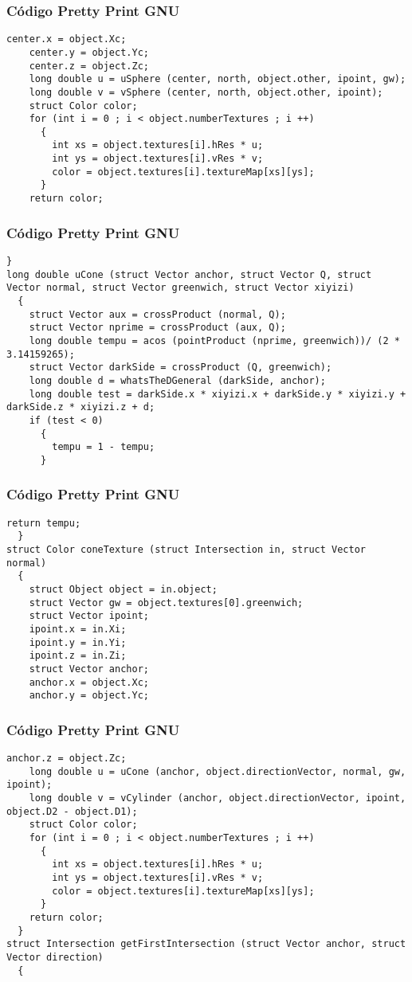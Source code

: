 \documentclass{beamer}
\begin{document}
\begin{frame}[fragile]
\frametitle{C\'odigo Pretty Print GNU}
\begin{lstlisting}[style=CStyle]
    center.x = object.Xc;
    center.y = object.Yc;
    center.z = object.Zc;
    long double u = uSphere (center, north, object.other, ipoint, gw);
    long double v = vSphere (center, north, object.other, ipoint);
    struct Color color;
    for (int i = 0 ; i < object.numberTextures ; i ++)
      {
        int xs = object.textures[i].hRes * u;
        int ys = object.textures[i].vRes * v;
        color = object.textures[i].textureMap[xs][ys];
      }
    return color;
\end{lstlisting}
\end{frame}
\begin{frame}[fragile]
\frametitle{C\'odigo Pretty Print GNU}
\begin{lstlisting}[style=CStyle]
  }
long double uCone (struct Vector anchor, struct Vector Q, struct Vector normal, struct Vector greenwich, struct Vector xiyizi)
  {
    struct Vector aux = crossProduct (normal, Q);
    struct Vector nprime = crossProduct (aux, Q);
    long double tempu = acos (pointProduct (nprime, greenwich))/ (2 * 3.14159265);
    struct Vector darkSide = crossProduct (Q, greenwich);
    long double d = whatsTheDGeneral (darkSide, anchor);
    long double test = darkSide.x * xiyizi.x + darkSide.y * xiyizi.y + darkSide.z * xiyizi.z + d;
    if (test < 0)
      {
        tempu = 1 - tempu;
      }
\end{lstlisting}
\end{frame}
\begin{frame}[fragile]
\frametitle{C\'odigo Pretty Print GNU}
\begin{lstlisting}[style=CStyle]
    return tempu;
  }
struct Color coneTexture (struct Intersection in, struct Vector normal)
  {
    struct Object object = in.object;
    struct Vector gw = object.textures[0].greenwich;
    struct Vector ipoint;
    ipoint.x = in.Xi;
    ipoint.y = in.Yi;
    ipoint.z = in.Zi;
    struct Vector anchor;
    anchor.x = object.Xc;
    anchor.y = object.Yc;
\end{lstlisting}
\end{frame}
\begin{frame}[fragile]
\frametitle{C\'odigo Pretty Print GNU}
\begin{lstlisting}[style=CStyle]
    anchor.z = object.Zc;
    long double u = uCone (anchor, object.directionVector, normal, gw, ipoint);
    long double v = vCylinder (anchor, object.directionVector, ipoint, object.D2 - object.D1);
    struct Color color;
    for (int i = 0 ; i < object.numberTextures ; i ++)
      {
        int xs = object.textures[i].hRes * u;
        int ys = object.textures[i].vRes * v;
        color = object.textures[i].textureMap[xs][ys];
      }
    return color;
  }
struct Intersection getFirstIntersection (struct Vector anchor, struct Vector direction)
  {
    \end{lstlisting}
\end{frame}
\end{document}
